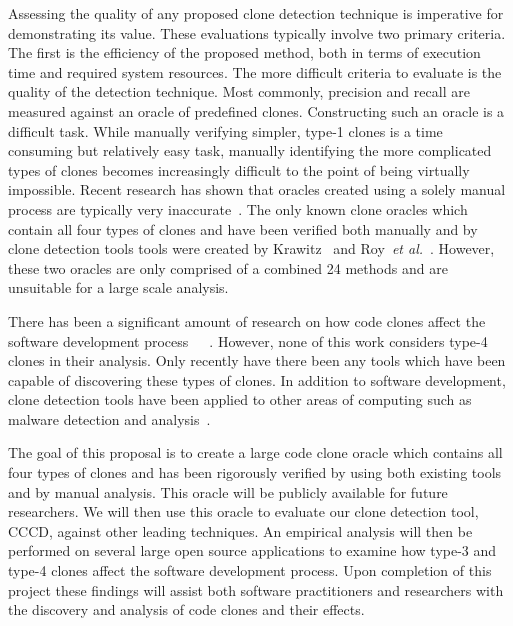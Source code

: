 \documentclass{article}
\begin{document}
Assessing the quality of any proposed clone detection technique is imperative for demonstrating its value. These evaluations typically involve two primary criteria. The first is the efficiency of the proposed method, both in terms of execution time and required system resources. The more difficult criteria to evaluate is the quality of the detection technique. Most commonly, precision and recall are measured against an oracle of predefined clones. Constructing such an oracle is a difficult task. While manually verifying simpler, type-1 clones is a time consuming but relatively easy task, manually identifying the more complicated types of clones becomes increasingly difficult to the point of being virtually impossible. Recent research has shown that oracles created using a solely manual process are typically very inaccurate~\cite{Walenstein:2003:PCT:950792.951349}. The only known clone oracles which contain all four types of clones and have been verified both manually and by clone detection tools tools were created by Krawitz~\cite{Kraw2012} and Roy~\emph{et al.}~\cite{Roy:2009:CEC:1530898.1531101}. However, these two oracles are only comprised of a combined 24 methods and are unsuitable for a large scale analysis.  

There has been a significant amount of research on how code clones affect the software development process~\cite{Juergens:2009:CCM:1555001.1555062}~\cite{Gode:2009:ETC:1637859.1638008}~\cite{Saha:2013:UET:2487085.2487117}. However, none of this work considers type-4 clones in their analysis. Only recently have there been any tools which have been capable of discovering these types of clones. In addition to software development, clone detection tools have been applied to other areas of computing such as malware detection and analysis~\cite{Saebjornsen:2009:DCC:1572272.1572287}.

The goal of this proposal is to create a large code clone oracle which contains all four types of clones and has been rigorously verified by using both existing tools and by manual analysis. This oracle will be publicly available for future researchers. We will then use this oracle to evaluate our clone detection tool, CCCD, against other leading techniques. An empirical analysis will then be performed on several large open source applications to examine how type-3 and type-4 clones affect the software development process. Upon completion of this project these findings will assist both software practitioners and researchers with the discovery and analysis of code clones and their effects. 
\end{document}
